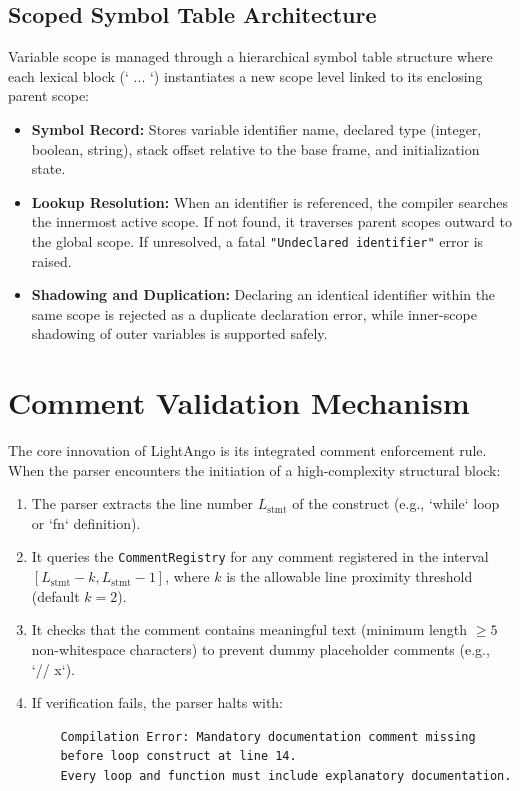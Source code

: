 \subsection{Scoped Symbol Table Architecture}
Variable scope is managed through a hierarchical symbol table structure where each lexical block (`{ ... }`) instantiates a new scope level linked to its enclosing parent scope:
\begin{itemize}
    \item \textbf{Symbol Record:} Stores variable identifier name, declared type (integer, boolean, string), stack offset relative to the base frame, and initialization state.
    \item \textbf{Lookup Resolution:} When an identifier is referenced, the compiler searches the innermost active scope. If not found, it traverses parent scopes outward to the global scope. If unresolved, a fatal \texttt{"Undeclared identifier"} error is raised.
    \item \textbf{Shadowing and Duplication:} Declaring an identical identifier within the same scope is rejected as a duplicate declaration error, while inner-scope shadowing of outer variables is supported safely.
\end{itemize}

\section{Comment Validation Mechanism}
The core innovation of LightAngo is its integrated comment enforcement rule. When the parser encounters the initiation of a high-complexity structural block:
\begin{enumerate}
    \item The parser extracts the line number $L_{\text{stmt}}$ of the construct (e.g., `while` loop or `fn` definition).
    \item It queries the \texttt{CommentRegistry} for any comment registered in the interval $[L_{\text{stmt}} - k, L_{\text{stmt}} - 1]$, where $k$ is the allowable line proximity threshold (default $k=2$).
    \item It checks that the comment contains meaningful text (minimum length $\ge 5$ non-whitespace characters) to prevent dummy placeholder comments (e.g., `// x`).
    \item If verification fails, the parser halts with:
    \begin{verbatim}
    Compilation Error: Mandatory documentation comment missing 
    before loop construct at line 14.
    Every loop and function must include explanatory documentation.
    \end{verbatim}
\end{enumerate}

